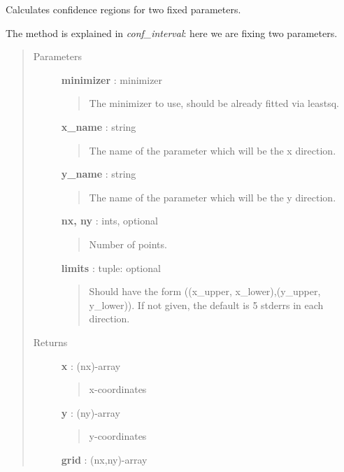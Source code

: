 \documentclass[letterpaper,10pt,english]{sphinxmanual}
\begin{document}
\begin{fulllineitems}
\label{confidence:confidence.conf_interval2d}
Calculates confidence regions for two fixed parameters.

The method is explained in \emph{conf\_interval}: here we are fixing
two parameters.
\begin{quote}\begin{description}
\item[{Parameters }] \leavevmode
\textbf{minimizer} : minimizer
\begin{quote}

The minimizer to use, should be already fitted via leastsq.
\end{quote}

\textbf{x\_name} : string
\begin{quote}

The name of the parameter which will be the x direction.
\end{quote}

\textbf{y\_name} : string
\begin{quote}

The name of the parameter which will be the y direction.
\end{quote}

\textbf{nx, ny} : ints, optional
\begin{quote}

Number of points.
\end{quote}

\textbf{limits} : tuple: optional
\begin{quote}

Should have the form ((x\_upper, x\_lower),(y\_upper, y\_lower)). If not
given, the default is 5 stderrs in each direction.
\end{quote}

\item[{Returns }] \leavevmode
\textbf{x} : (nx)-array
\begin{quote}

x-coordinates
\end{quote}

\textbf{y} : (ny)-array
\begin{quote}

y-coordinates
\end{quote}

\textbf{grid} : (nx,ny)-array
\begin{quote}


\end{quote}
\end{description}
\end{quote}
\end{fulllineitems}
\end{document}
